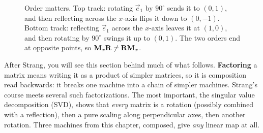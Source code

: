 \begin{figure}[H]
\caption{Order matters. Top track: rotating $\vec{e}_1$ by $90^\circ$ sends it to
$(0,1)$, and then reflecting across the $x$-axis flips it down to $(0,-1)$.
Bottom track: reflecting $\vec{e}_1$ across the $x$-axis leaves it at $(1,0)$, and
then rotating by $90^\circ$ swings it up to $(0,1)$. The two orders end at
opposite points, so $\mathbf{M}_x\mathbf{R} \neq \mathbf{R}\mathbf{M}_x$.}
\label{ch05:fig-order}
\end{figure}

\begin{strangbox}
After Strang, you will see this section behind much of what follows.
\textbf{Factoring} a matrix means writing it as a product of simpler matrices, so
it is composition read backwards: it breaks one machine into a chain of simpler
machines. Strang's course meets several such factorizations. The most important,
the singular value decomposition (SVD), shows that \emph{every} matrix is a
rotation (possibly combined with a reflection), then a pure scaling along
perpendicular axes, then another rotation. Three machines from this chapter,
composed, give \emph{any} linear map at all.
\end{strangbox}

